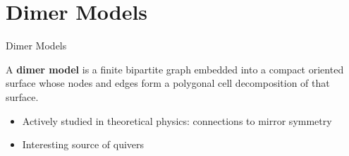 \section{Dimer Models}

\begin{frame}{Dimer Models}
    \begin{definition}
        \justifying
        A \textbf{dimer model} is a finite bipartite graph embedded into a compact oriented surface whose nodes and edges form a polygonal cell decomposition of that surface.
    \end{definition}

    \begin{itemize}
        \item Actively studied in theoretical physics: connections to mirror symmetry
        
        \item Interesting source of quivers
    \end{itemize}
\end{frame}


